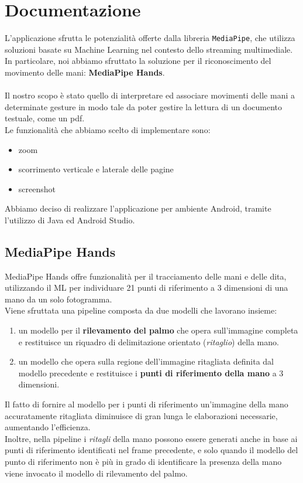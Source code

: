 \chapter{Documentazione}

L'applicazione sfrutta le potenzialità offerte dalla libreria \texttt{MediaPipe}, che utilizza soluzioni basate su Machine Learning nel contesto dello streaming multimediale. 
In particolare, noi abbiamo sfruttato la soluzione per il riconoscimento del movimento delle mani: \textbf{MediaPipe Hands}.\\
\\
\noindent Il nostro scopo è stato quello di interpretare ed associare movimenti delle mani a determinate gesture in modo tale da poter gestire la lettura di un documento testuale, come un pdf.\\Le funzionalità che abbiamo scelto di implementare sono:
\begin{itemize}
    \item zoom
    \item scorrimento verticale e laterale delle pagine
    \item screenshot
\end{itemize}
\noindent Abbiamo deciso di realizzare l'applicazione per ambiente Android, tramite l'utilizzo di Java ed Android Studio.


\section{MediaPipe Hands}

MediaPipe Hands offre funzionalità per il tracciamento delle mani e delle dita, utilizzando il ML per individuare 21 punti di riferimento a 3 dimensioni di una mano da un solo fotogramma.\\
Viene sfruttata una pipeline composta da due modelli che lavorano insieme:
\begin{enumerate}
    \item un modello per il \textbf{rilevamento del palmo} che opera sull'immagine completa e restituisce un riquadro di delimitazione orientato (\textit{ritaglio}) della mano. 
    \item un modello che opera sulla regione dell'immagine ritagliata definita dal modello precedente e restituisce i \textbf{punti di riferimento della mano} a 3 dimensioni.
\end{enumerate}

\noindent Il fatto di fornire al modello per i punti di riferimento un'immagine della mano accuratamente ritagliata diminuisce di gran lunga le elaborazioni necessarie, aumentando l'efficienza.\\
Inoltre, nella pipeline i \textit{ritagli} della mano possono essere generati anche in base ai punti di riferimento identificati nel frame precedente, e solo quando il modello del punto di riferimento non è più in grado di identificare la presenza della mano viene invocato il modello di rilevamento del palmo.

